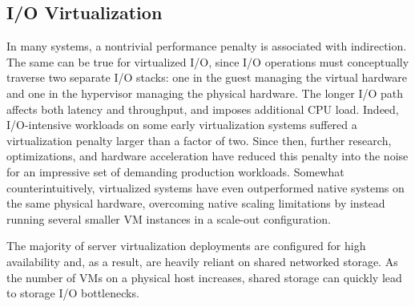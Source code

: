\subsection{I/O Virtualization}
\label{sec:vir}
In many systems, a nontrivial performance penalty is associated with indirection. The same can be true for virtualized I/O, since I/O operations must conceptually traverse two separate I/O stacks: one in the guest managing the virtual hardware and one in the hypervisor managing the physical hardware. The longer I/O path affects both latency and throughput, and imposes additional CPU load. Indeed, I/O-intensive workloads on some early virtualization systems suffered a virtualization penalty larger than a factor of two. Since then, further research, optimizations, and hardware acceleration have reduced this penalty into the noise for an impressive set of demanding production workloads. Somewhat counterintuitively, virtualized systems have even outperformed native systems on the same physical hardware, overcoming native scaling limitations by instead running several smaller VM instances in a scale-out configuration.

The majority of server virtualization deployments are configured for high availability and, as a result, are heavily reliant on shared networked storage. As the number of VMs on a physical host increases, shared storage can quickly lead to storage I/O bottlenecks.

